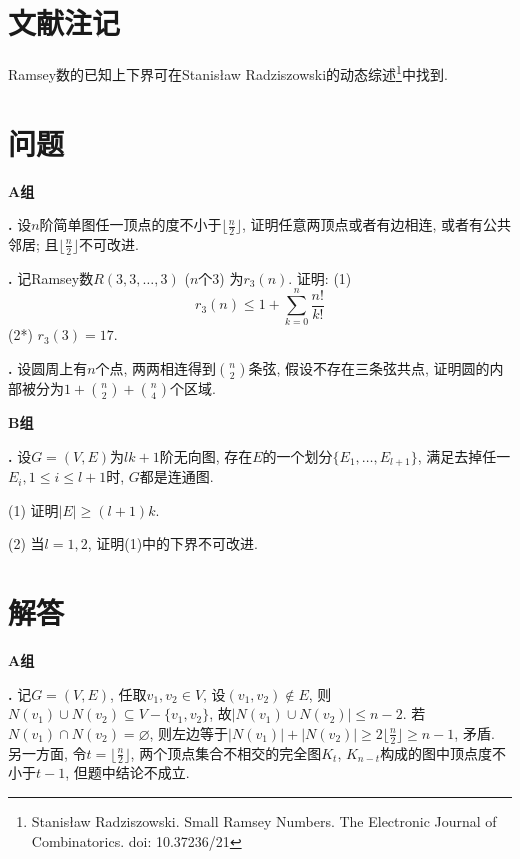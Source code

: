 \section*{文献注记}

\par Ramsey数的已知上下界可在Stanisław Radziszowski的动态综述\footnote{Stanisław Radziszowski. Small Ramsey Numbers. The Electronic Journal of Combinatorics. doi: 10.37236/21}中找到. 

\section*{问题}

\textbf{A组}

\par \textbf{\theprobgraph .} \cite{CGT} 设$n$阶简单图任一顶点的度不小于$\lfloor \frac{n}{2}\rfloor$, 证明任意两顶点或者有边相连, 或者有公共邻居; 且$\lfloor \frac{n}{2}\rfloor$不可改进. 

\par \textbf{\theprobgraph .} \cite{IC} 记Ramsey数$R(3,3,\dots,3)$ ($n$个3) 为$r_3(n)$. 证明: (1) 
\begin{equation}
    r_3(n) \le 1+\sum_{k=0}^n \frac{n!}{k!}
\end{equation}
(2*) $r_3(3)=17$.

\par \textbf{\theprobgraph .} \cite{BN} 设圆周上有$n$个点, 两两相连得到$\binom{n}{2}$条弦, 假设不存在三条弦共点, 证明圆的内部被分为$1+\binom{n}{2}+\binom{n}{4}$个区域. 

\textbf{B组}

\par \textbf{\theprobgraph .} \cite{MaP} 设$G=(V,E)$为$lk+1$阶无向图, 存在$E$的一个划分$\{E_1, \dots, E_{l+1}\}$, 满足去掉任一$E_i, 1\le i\le l+1$时, $G$都是连通图. 
\par (1) 证明$|E|\ge (l+1)k$.
\par (2) 当$l=1,2$, 证明(1)中的下界不可改进. 


\section*{解答}

\textbf{A组}

\par \textbf{\thesolgraph .} 记$G=(V,E)$, 任取$v_1,v_2\in V$, 设$(v_1,v_2)\notin E$, 则$N(v_1)\cup N(v_2)\subseteq V-\{v_1,v_2\}$, 故$|N(v_1)\cup N(v_2)|\le n-2$. 若$N(v_1)\cap N(v_2)=\varnothing$, 则左边等于$|N(v_1)|+|N(v_2)|\ge 2\lfloor \frac{n}{2}\rfloor\ge n-1$, 矛盾. 另一方面, 令$t=\lfloor \frac{n}{2}\rfloor$, 两个顶点集合不相交的完全图$K_{t}$, $K_{n-t}$构成的图中顶点度不小于$t-1$, 但题中结论不成立.

